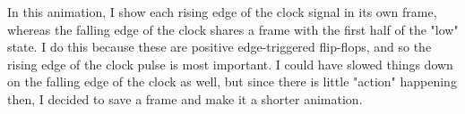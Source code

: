 In this animation, I show each rising edge of the clock signal in its own frame, whereas the falling edge of the clock shares a frame with the first half of the "low" state.  I do this because these are positive edge-triggered flip-flops, and so the rising edge of the clock pulse is most important.  I could have slowed things down on the falling edge of the clock as well, but since there is little "action" happening then, I decided to save a frame and make it a shorter animation.




